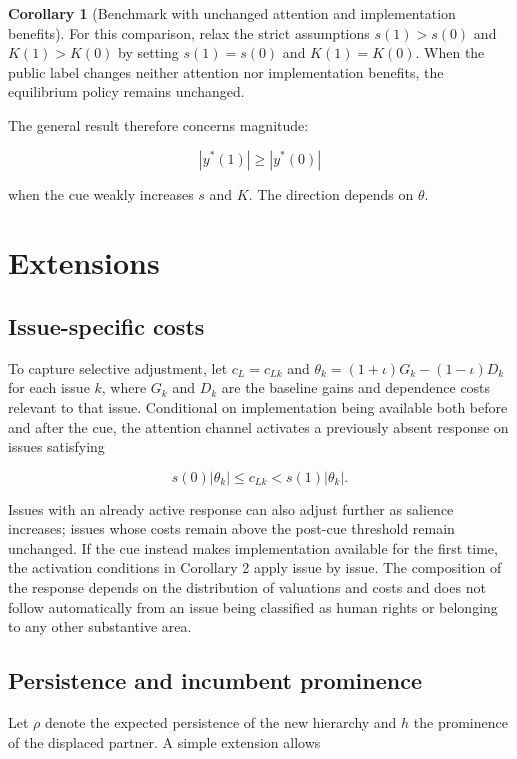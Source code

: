 \documentclass[
  11pt,
]{article}
\theoremstyle{definition}
\newtheorem{corollary}{Corollary}
\begin{document}
\begin{corollary}[Benchmark with unchanged attention and implementation benefits]
For this comparison, relax the strict assumptions $s(1)>s(0)$ and $K(1)>K(0)$ by setting $s(1)=s(0)$ and $K(1)=K(0)$. When the public label changes neither attention nor implementation benefits, the equilibrium policy remains unchanged.
\end{corollary}

The general result therefore concerns magnitude:

\[
|y^*(1)|\geq|y^*(0)|
\]

when the cue weakly increases \(s\) and \(K\). The direction depends on
\(\theta\).

\section{Extensions}\label{extensions}

\subsection{Issue-specific costs}\label{issue-specific-costs}

To capture selective adjustment, let \(c_L=c_{Lk}\) and
\(\theta_k=(1+\iota)G_k-(1-\iota)D_k\) for each issue \(k\), where
\(G_k\) and \(D_k\) are the baseline gains and dependence costs relevant
to that issue. Conditional on implementation being available both before
and after the cue, the attention channel activates a previously absent
response on issues satisfying

\[
s(0)|\theta_k|\leq c_{Lk}<s(1)|\theta_k|.
\]

Issues with an already active response can also adjust further as
salience increases; issues whose costs remain above the post-cue
threshold remain unchanged. If the cue instead makes implementation
available for the first time, the activation conditions in Corollary 2
apply issue by issue. The composition of the response depends on the
distribution of valuations and costs and does not follow automatically
from an issue being classified as human rights or belonging to any other
substantive area.

\subsection{Persistence and incumbent
prominence}\label{persistence-and-incumbent-prominence}

Let \(\rho\) denote the expected persistence of the new hierarchy and
\(h\) the prominence of the displaced partner. A simple extension allows
\end{document}
